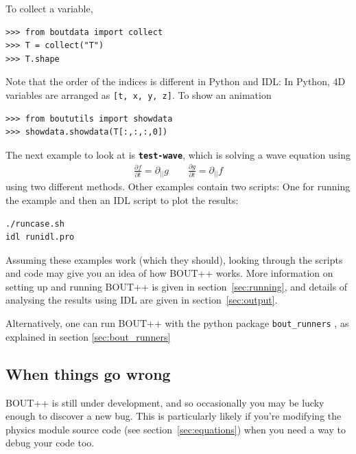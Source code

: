 \documentclass[12pt]{article}
\newcommand{\code}[1]{\texttt{#1}}
\newcommand{\file}[1]{\texttt{\bf #1}}
\newcommand{\deriv}[2]{\ensuremath{\frac{\partial #1}{\partial #2}}}
\begin{document}
%
To collect a variable,
%
\begin{verbatim}
>>> from boutdata import collect
>>> T = collect("T")
>>> T.shape
\end{verbatim}
%
Note that the order of the indices is different in Python and IDL: In Python,
4D variables are arranged as \code{[t, x, y, z]}.  To show an animation
%
\begin{verbatim}
>>> from boututils import showdata
>>> showdata.showdata(T[:,:,:,0])
\end{verbatim}
%
The next example to look at is \file{test-wave}, which is solving a wave
equation using
%
\begin{align}
\deriv{f}{t} = \partial_{||} g \qquad \deriv{g}{t} = \partial_{||} f
\end{align}
%
using two different methods. Other examples contain two scripts: One for
running the example and then an IDL script to plot the results:
%
\begin{verbatim}
./runcase.sh
idl runidl.pro
\end{verbatim}
%
Assuming these examples work (which they should), looking through the scripts
and code may give you an idea of how BOUT++ works. More information on setting
up and running BOUT++ is given in section~\ref{sec:running}, and details of
analysing the results using IDL are given in section~\ref{sec:output}.

Alternatively, one can run BOUT++ with the python package
%
\lstinline!bout_runners!
%
, as explained in section \ref{sec:bout_runners}



\subsection{When things go wrong}
%
BOUT++ is still under development, and so occasionally you may be lucky enough
to discover a new bug. This is particularly likely if you're modifying the
physics module source code (see section~\ref{sec:equations}) when you need a
way to debug your code too.
\end{document}
